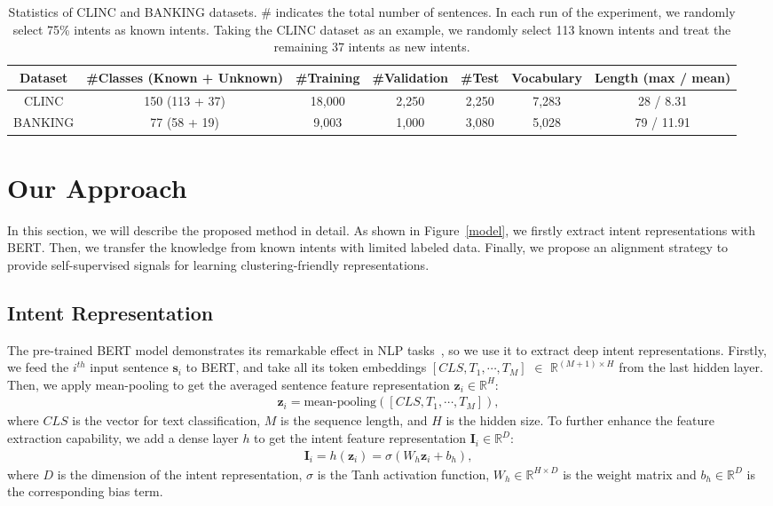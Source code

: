 \documentclass[letterpaper]{article} \usepackage{aaai21}  \usepackage{times}  \usepackage{helvet} \usepackage{courier}  \usepackage[hyphens]{url}  \usepackage{graphicx} \urlstyle{rm} \def\UrlFont{\rm}  \usepackage{natbib}  \usepackage{caption} \frenchspacing  \setlength{\pdfpagewidth}{8.5in}  \setlength{\pdfpageheight}{11in}  \usepackage{amsmath}
\begin{document}
	\begin{table*}[t!]
		\centering
		\begin{tabular}{@{} ccccccc @{}}
			\toprule
			Dataset & \#Classes (Known + Unknown) & \#Training & \#Validation & \#Test & Vocabulary & Length (max / mean) \\
			\midrule
			CLINC & 150 (113 + 37) & 18,000 & 2,250 & 2,250 & 7,283 & 28 / 8.31 \\
			BANKING & 77 (58 + 19) & 9,003 & 1,000 & 3,080 & 5,028 & 79 / 11.91 \\ 
			\bottomrule
		\end{tabular}
		\caption{ \label{datasets}  Statistics of CLINC and BANKING datasets. \# indicates the total number of sentences. In each run of the experiment, we randomly select 75\% intents as known intents. Taking the CLINC dataset as an example, we randomly select 113 known intents and treat the remaining 37 intents as new intents. }
	\end{table*}
	
	
	\section{Our Approach}
	In this section, we will describe the proposed method in detail. As shown in Figure~\ref{model}, we firstly extract intent representations with BERT. Then, we transfer the knowledge from known intents with limited labeled data. Finally, we propose an alignment strategy to provide self-supervised signals for learning clustering-friendly representations. 
	
	\subsection{Intent Representation}
	The pre-trained BERT model demonstrates its remarkable effect in NLP tasks~\citep{devlin2018bert}, so we use it to extract deep intent representations. Firstly, we feed the $i^{th}$ input sentence $\boldsymbol{s}_{i}$ to BERT, and take all its token embeddings $[CLS, T_1, \cdots, T_M]$ $\in$ $\mathds R^{(M+1) \times H}$ from the last hidden layer. Then, we apply mean-pooling to get the averaged sentence feature representation $\boldsymbol{z}_{i} \in \mathds R^{H}$:
	\begin{align}
		\boldsymbol{z}_{i} = \text{mean-pooling}([CLS, T_1, \cdots, T_M]),
	\end{align}
	where $CLS$ is the vector for text classification, $M$ is the sequence length, and $H$ is the hidden size. To further enhance the feature extraction capability, we add a dense layer $h$ to get the intent feature representation $\boldsymbol{I}_{i} \in \mathds R^{D}$:
	\begin{align}
		\boldsymbol{I}_{i}=h(\boldsymbol{z}_i) = \sigma(W_h\boldsymbol{z}_{i}+b_h),
	\end{align}
	where $D$ is the dimension of the intent representation, $\sigma$ is the Tanh activation function,  $W_h \in \mathds R^{H \times D}$ is the weight matrix and $b_h \in \mathds R^{D}$ is the corresponding bias term.
	
\end{document}
